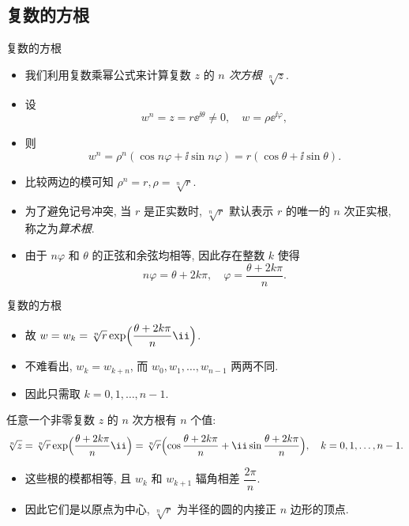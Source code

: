 \subsection{复数的方根}
\begin{frame}{复数的方根}
	\begin{itemize}
		\item 我们利用复数乘幂公式来计算复数 $z$ 的 \emph{$n$ 次方根 $\sqrt[n]z$}.
		\item 设
		\[
			w^n=z=r\ee^{\ii\theta}\neq0,\quad
			w=\rho \ee^{\ii\varphi},
		\]
		\item 则
		\[
			w^n=\rho^n(\cos{n\varphi}+\ii\sin{n\varphi})
			=r(\cos\theta+\ii\sin\theta).
		\]
		\item 比较两边的模可知 $\rho^n=r,\rho=\sqrt[n]r$.
		\item 为了避免记号冲突, 当 $r$ 是正实数时, $\sqrt[n]r$ 默认表示 $r$ 的唯一的 $n$ 次正实根, 称之为\emph{算术根}.
		\item 由于 $n\varphi$ 和 $\theta$ 的正弦和余弦均相等, 因此存在整数 $k$ 使得
		\[
			n\varphi=\theta+2k\pi,\quad
			\varphi=\frac{\theta+2k\pi}n.
		\]
	\end{itemize}
\end{frame}


\begin{frame}{复数的方根}
	\begin{itemize}
		\item 故 $w=w_k=\sqrt[n]r\exp\Bigl(\dfrac{\theta+2k\pi}n\ii\Bigr)$.
		\item 不难看出, $w_k=w_{k+n}$, 而 $w_0,w_1,\dots,w_{n-1}$ 两两不同.
		\item 因此只需取 $k=0,1,\dots,n-1$.
	\end{itemize}
	\onslide<+->
	\begin{theorem}[][复数的方根]
		任意一个非零复数 $z$ 的 $n$ 次方根有 $n$ 个值:
		\[
			\sqrt[n]z=\sqrt[n]r\exp\Bigl(\dfrac{\theta+2k\pi}n\ii\Bigr)\\
			=\sqrt[n]r\Bigl(\cos\frac{\theta+2k\pi}n+\ii\sin\frac{\theta+2k\pi}n\Bigr),\quad k=0,1,\dots,n-1.
		\]
	\end{theorem}
	\begin{itemize}
		\item 这些根的模都相等, 且 $w_k$ 和 $w_{k+1}$ 辐角相差 $\dfrac{2\pi}n$.
		\item 因此\alert{它们是以原点为中心, $\sqrt[n]r$ 为半径的圆的内接正 $n$ 边形的顶点}.
	\end{itemize}
\end{frame}


